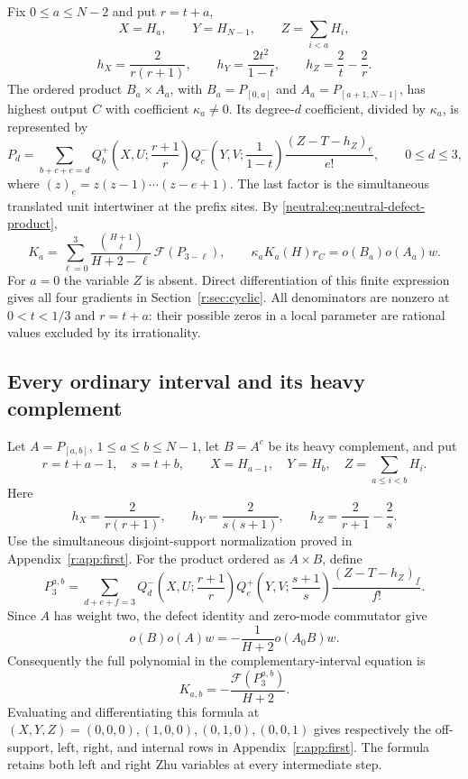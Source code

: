 \documentclass[11pt,a4paper]{article}
\numberwithin{equation}{section}
\theoremstyle{definition}\newtheorem{definition}[theorem]{Definition}
\theoremstyle{remark}\newtheorem{remark}[theorem]{Remark}
\begin{document}
Fix $0\leq a\leq N-2$ and put $r=t+a$,
\[
 X=H_a,\qquad Y=H_{N-1},\qquad Z=\sum_{i<a}H_i,
\]
\[
 h_X=\frac2{r(r+1)},\qquad
 h_Y=\frac{2t^2}{1-t},\qquad h_Z=\frac2t-\frac2r.
\]
The ordered product $B_a\times A_a$, with $B_a=P_{[0,a]}$ and
$A_a=P_{[a+1,N-1]}$, has highest output $C$ with coefficient
$\kappa_a\ne0$.  Its degree-$d$ coefficient, divided by $\kappa_a$,
is represented by
\[
 P_d=\sum_{b+c+e=d}
 Q_b^+\!\left(X,U;\frac{r+1}{r}\right)
 Q_c^-\!\left(Y,V;\frac1{1-t}\right)
 \frac{(Z-T-h_Z)_{\underline e}}{e!},
                         \qquad0\leq d\leq3,
\]
where $(z)_{\underline e}=z(z-1)\cdots(z-e+1)$.
The last factor is the simultaneous translated unit intertwiner at
the prefix sites.  By \eqref{neutral:eq:neutral-defect-product},
\begin{equation}\label{neutral:eq:explicit-prefix-K}
 K_a=\sum_{\ell=0}^{3}
       \frac{\binom{H+1}{\ell}}{H+2-\ell}\,
                           \mathcal F(P_{3-\ell}),
 \qquad
 \kappa_aK_a(H)r_C=o(B_a)o(A_a)w.
\end{equation}
For $a=0$ the variable $Z$ is absent.  Direct differentiation of
this finite expression gives all four gradients in
Section~\ref{r:sec:cyclic}.  All denominators are nonzero at
$0<t<1/3$ and $r=t+a$: their possible zeros in a local parameter
are rational values excluded by its irrationality.

\subsection{Every ordinary interval and its heavy complement}

Let $A=P_{[a,b]}$, $1\leq a\leq b\leq N-1$, let $B=A^c$ be its
heavy complement, and put
\[
 r=t+a-1,\quad s=t+b,\qquad
 X=H_{a-1},\quad Y=H_b,\quad Z=\sum_{a\leq i<b}H_i.
\]
Here
\[
 h_X=\frac2{r(r+1)},\qquad h_Y=\frac2{s(s+1)},\qquad
 h_Z=\frac2{r+1}-\frac2s.
\]
Use the simultaneous disjoint-support normalization proved in
Appendix~\ref{r:app:first}.  For the product ordered as $A\times B$,
define
\[
 P_3^{a,b}=\sum_{d+e+f=3}
 Q_d^-\!\left(X,U;\frac{r+1}{r}\right)
 Q_e^+\!\left(Y,V;\frac{s+1}{s}\right)
                  \frac{(Z-T-h_Z)_{\underline f}}{f!}.
\]
Since $A$ has weight two, the defect identity and zero-mode
commutator give
\[
 o(B)o(A)w=-\frac1{H+2}o(A_0B)w.
\]
Consequently the full polynomial in the complementary-interval
equation is
\begin{equation}\label{neutral:eq:explicit-all-interval-K}
                 K_{a,b}=-\frac{\mathcal F(P_3^{a,b})}{H+2}.
\end{equation}
Evaluating and differentiating this formula at
$(X,Y,Z)=(0,0,0),(1,0,0),(0,1,0),(0,0,1)$ gives respectively
the off-support, left, right, and internal rows in
Appendix~\ref{r:app:first}.  The formula retains both left and
right Zhu variables at every intermediate step.
\end{document}
